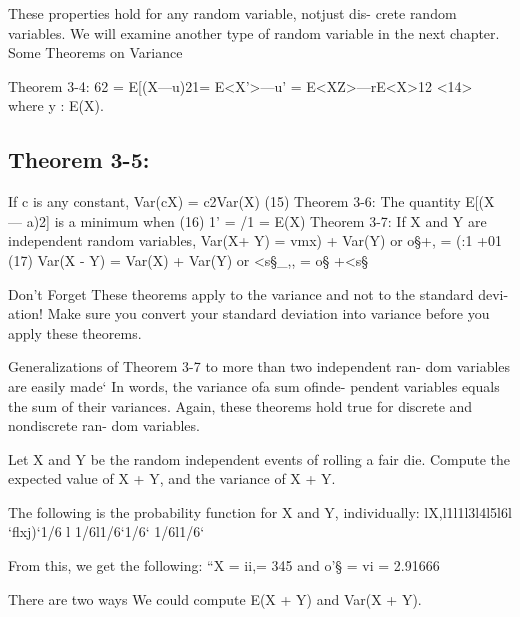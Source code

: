 These properties hold for any random variable, notjust dis-
crete random variables. We will examine another type of
random variable in the next chapter.
Some Theorems on Variance

Theorem 3-4:
62 = E[(X—u)21= E<X’>—u’ = E<XZ>—rE<X>12 <14>
where y : E(X).


\subsection{Theorem 3-5:} If c is any constant,
Var(cX) = c2Var(X) (15)
Theorem 3-6: The quantity E[(X — a)2] is a minimum when (16)
1' = /1 = E(X)
Theorem 3-7: If X and Y are independent random variables,
Var(X+ Y) = vmx) + Var(Y) or o§+, = (:1 +01 (17)
Var(X - Y) = Var(X) + Var(Y) or <s§_,, = o§ +<s§

Don’t Forget
These theorems apply to the variance and not to the standard devi-
ation! Make sure you convert your
standard deviation into variance
before you apply these theorems.

Generalizations of Theorem 3-7 to more than two independent ran-
dom variables are easily made‘ In words, the variance ofa sum ofinde-
pendent variables equals the sum of their variances.
Again, these theorems hold true for discrete and nondiscrete ran-
dom variables.



Let X and Y be the random independent events of
rolling a fair die. Compute the expected value of X + Y, and the variance
of X + Y.

The following is the probability function for X and Y, individually:
lX,l1l1l3l4l5l6l
‘ﬂxj)‘1/6 l 1/6l1/6‘1/6‘ 1/6l1/6‘

From this, we get the following:
“X = ii,= 345 and o'§ = vi = 2.91666

There are two ways We could compute E(X + Y) and Var(X + Y).


